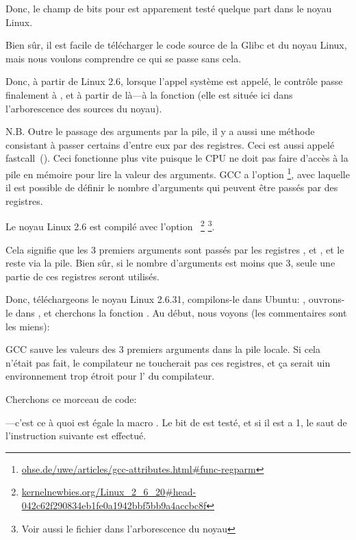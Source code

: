 Donc, le champ de bits pour  est apparement testé quelque part dans le
noyau Linux.

Bien sûr, il est facile de télécharger le code source de la Glibc et du noyau Linux,
mais nous voulons comprendre ce qui se passe sans cela.

Donc, à partir de Linux 2.6, lorsque l'appel système  est appelé, le
contrôle passe finalement à , et à partir de là---à la fonction
 (elle est située ici  dans l'arborescence des
sources du noyau).

\newcommand{\URLREGPARM}{\href{http://go.yurichev.com/17040}{ohse.de/uwe/articles/gcc-attributes.html\#func-regparm}}

\label{regparm}
N.B. Outre le passage des arguments par la pile, il y a aussi une méthode consistant
à passer certains d'entre eux par des registres. Ceci est aussi appelé fastcall~().
Ceci fonctionne plus vite puisque le CPU ne doit pas faire d'accès à la pile en mémoire
pour lire la valeur des arguments.
GCC a l'option \footnote{\URLREGPARM}, avec laquelle il est possible
de définir le nombre d'arguments qui peuvent être passés par des registres.

\newcommand{\URLKERNELNEWB}{\href{http://go.yurichev.com/17066}{kernelnewbies.org/Linux\_2\_6\_20\#head-042c62f290834eb1fe0a1942bbf5bb9a4accbc8f}}
\newcommand{\CALLINGHFILE}{arch/x86/include/asm/calling.h}

Le noyau Linux 2.6 est compilé avec l'option ~\footnote{\URLKERNELNEWB}
\footnote{Voir aussi le fichier \TT{\CALLINGHFILE} dans l'arborescence du noyau}.

Cela signifie que les 3 premiers arguments sont passés par les registres \EAX, \EDX
et \ECX, et le reste via la pile.
Bien sûr, si le nombre d'arguments est moins que 3, seule une partie de ces registres
seront utilisés.

Donc, téléchargeons le noyau Linux 2.6.31, compilons-le dans Ubuntu: ,
ouvrons-le dans \IDA, et cherchons la fonction . Au début, nous
voyons (les commentaires sont les miens):



GCC sauve les valeurs des 3 premiers arguments dans la pile locale.
Si cela n'était pas fait, le compilateur ne toucherait pas ces registres, et ça serait
uin environnement trop étroit pour l'
du compilateur.

Cherchons ce morceau de code:



---c'est ce à quoi est égale la macro .
Le bit  de  est testé, et si il est a 1, le saut de l'instruction
\JNZ suivante est effectué.
